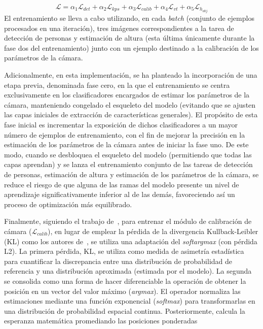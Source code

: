 \begin{equation}\label{eq:LossPhaseTwo}
  \mathcal{L} = \alpha_1\mathcal{L}_{det} + \alpha_2\mathcal{L}_{kps} + \alpha_3\mathcal{L}_{calib} + \alpha_4\mathcal{L}_{vt} + \alpha_5\mathcal{L}_{h_{obj}}
\end{equation}
El entrenamiento se lleva a cabo utilizando, en cada \emph{batch} (conjunto de ejemplos procesados en una iteración),
tres imágenes correspondientes a la tarea de detección de personas y estimación de altura
(esta última únicamente durante la fase dos del entrenamiento)
junto con un ejemplo destinado a la calibración de los parámetros de la cámara.
\par
Adicionalmente, en esta implementación, se ha planteado la incorporación de una etapa previa,
denominada fase cero, en la que el entrenamiento se centra exclusivamente en los clasificadores
encargados de estimar los parámetros de la cámara, manteniendo congelado el esqueleto del modelo
(evitando que se ajusten las capas iniciales de extracción de características generales).
El propósito de esta fase inicial es incrementar la exposición de dichos clasificadores a un mayor número de ejemplos de entrenamiento,
con el fin de mejorar la precisión en la estimación de los parámetros de la cámara antes de iniciar la fase uno.
De este modo, cuando se desbloquea el esqueleto del modelo (permitiendo que todas las capas aprendan)
y se lanza el entrenamiento conjunto de las tareas de detección de personas, estimación de altura y estimación de los parámetros de la cámara,
se reduce el riesgo de que alguna de las ramas del modelo presente un nivel de aprendizaje significativamente inferior al de las demás,
favoreciendo así un proceso de optimización más equilibrado.
\par
Finalmente, siguiendo el trabajo de~\cite{SPEC}, para entrenar el módulo de calibración de cámara ($\mathcal{L}_{calib}$),
en lugar de emplear la pérdida de la divergencia Kullback-Leibler (KL) como los autores de~\cite{SVMIW},
se utiliza una adaptación del \emph{softargmax} (con pérdida L2).
La primera pérdida, KL, se utiliza como medida de asimetría estadística para cuantificar la discrepancia entre
una distribución de probabilidad de referencia y una distribución aproximada (estimada por el modelo). La segunda se
consolida como una forma de hacer diferenciable la operación de obtener la posición en un vector del valor máximo (\emph{argmax}).
El operador normaliza las estimaciones mediante una función exponencial (\emph{softmax}) para transformarlas en una distribución
de probabilidad espacial continua. Posteriormente, calcula la esperanza matemática promediando las posiciones ponderadas
